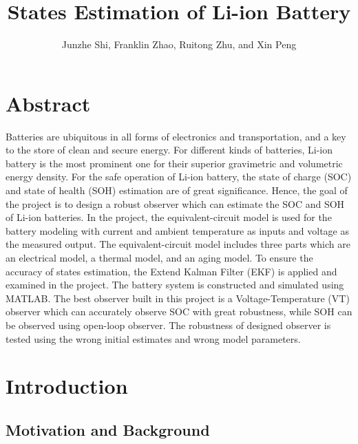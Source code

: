 \documentclass[12pt]{article}
\title{States Estimation of Li-ion Battery}
\author{Junzhe Shi, Franklin Zhao, Ruitong Zhu, and Xin Peng}
\date{}
\begin{document}
\maketitle

\maketitle
\section*{Abstract}

Batteries are ubiquitous in all forms of electronics and transportation, and a key to the store of clean and secure energy. For different kinds of batteries,  Li-ion battery is the most prominent one for their superior gravimetric and volumetric energy density.  For the safe operation of Li-ion battery, the state of charge (SOC) and state of health (SOH) estimation are of great significance. Hence, the goal of the project is to design a robust observer which can estimate the SOC and SOH of Li-ion batteries. In the project, the equivalent-circuit model is used for the battery modeling with current and ambient temperature as inputs and voltage as the measured output. The equivalent-circuit model includes three parts which are an electrical model, a thermal model, and an aging model. To ensure the accuracy of states estimation, the Extend Kalman Filter (EKF) is applied and examined in the project. The battery system is constructed and simulated using MATLAB. The best observer built in this project is a Voltage-Temperature (VT) observer which can accurately observe SOC with great robustness, while SOH can be observed using open-loop observer. The robustness of designed observer is tested using the wrong initial estimates and wrong model parameters.

\section*{Introduction}
\subsection*{Motivation and Background} 
\end{document}
